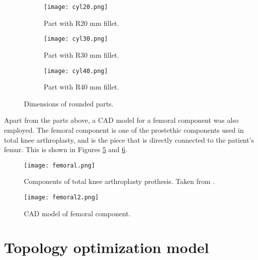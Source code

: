 \documentclass[../main.tex]{subfiles}
\begin{document}
\begin{figure}
  \begin{subfigure}{0.3\textwidth}
	\begin{center}
		\texttt{[image: cyl20.png]}
	\end{center}
	\caption{Part with R20 mm fillet.}\label{fig:cyl20}
  \end{subfigure}
\begin{subfigure}{0.3\textwidth}
	\begin{center}
		\texttt{[image: cyl30.png]}
	\end{center}
	\caption{Part with R30 mm fillet.}\label{fig:cyl30}
\end{subfigure}
\begin{subfigure}{0.3\textwidth}
	\begin{center}
		\texttt{[image: cyl40.png]}
	\end{center}
	\caption{Part with R40 mm fillet.}\label{fig:cyl40}
\end{subfigure}
\caption{Dimensions of rounded parts.}
\end{figure}

Apart from the parts above, a CAD model for a femoral component was also employed. The femoral component is one of the prostethic components used in total knee arthroplasty, and is the piece that is directly connected to the patient's femur. This is shown in Figures \ref{fig:fem1} and \ref{fig:fem2}.

\begin{figure}
  \begin{center}
  \texttt{[image: femoral.png]}
\end{center}
  \caption{Components of total knee arthroplasty prothesis. Taken from \cite{leopoldMinimallyInvasiveTotal2009}.}
  \label{fig:fem1}
\end{figure}

\begin{figure}
  \begin{center}
  \texttt{[image: femoral2.png]}
\end{center}
  \caption{CAD model of femoral component.}
  \label{fig:fem2}
\end{figure}

\section{Topology optimization model}
\end{document}
